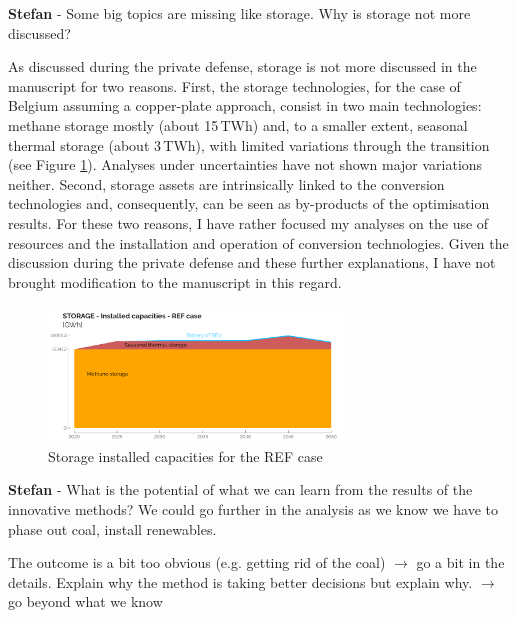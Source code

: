 \documentclass[12pt,a4paper]{article}
\begin{document}
\begin{mdframed}[style=comment] %
{\color{teal} \textbf{Stefan}} - Some big topics are missing like storage. Why is storage not more discussed? 
\end{mdframed}

\noindent As discussed during the private defense, storage is not more discussed in the manuscript for two reasons. First, the storage technologies, for the case of Belgium assuming a copper-plate approach, consist in two main technologies: methane storage mostly (about 15\,TWh) and, to a smaller extent, seasonal thermal storage (about 3\,TWh), with limited variations through the transition (see Figure \ref{fig:STORAGE_2}). Analyses under uncertainties have not shown major variations neither. Second, storage assets are intrinsically linked to the conversion technologies and, consequently, can be seen as by-products of the optimisation results. For these two reasons, I have rather focused my analyses on the use of resources and the installation and operation of conversion technologies. Given the discussion during the private defense and these further explanations, I have not brought modification to the manuscript in this regard.

\begin{figure}[htbp!]
\centering
\includegraphics[width=0.7\textwidth]{STORAGE_2.pdf}
\caption{Storage installed capacities for the REF case}
\label{fig:STORAGE_2}
\end{figure}

\begin{mdframed}[style=comment] %
{\color{teal} \textbf{Stefan}} - What is the potential of what we can learn from the results of the innovative methods? We could go further in the analysis as we know we have to phase out coal, install renewables.
\end{mdframed}

\noindent The outcome is a bit too obvious (e.g. getting rid of the coal) $\rightarrow$ go a bit in the details. Explain why the method is taking better decisions but explain why. $\rightarrow$ go beyond what we know
\end{document}
